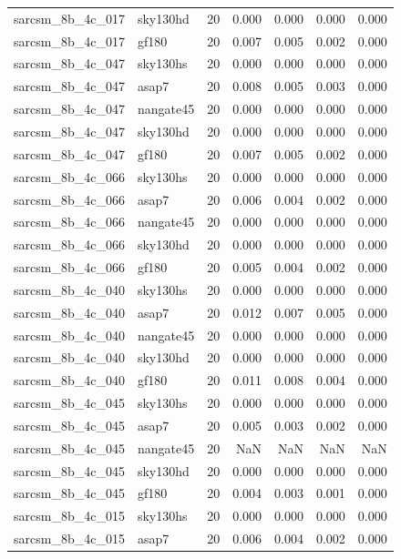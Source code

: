 \begin{tabular}{llrrrrr}
sarcsm\_8b\_4c\_017 & sky130hd & 20 & 0.000 & 0.000 & 0.000 & 0.000 \\
sarcsm\_8b\_4c\_017 & gf180 & 20 & 0.007 & 0.005 & 0.002 & 0.000 \\
sarcsm\_8b\_4c\_047 & sky130hs & 20 & 0.000 & 0.000 & 0.000 & 0.000 \\
sarcsm\_8b\_4c\_047 & asap7 & 20 & 0.008 & 0.005 & 0.003 & 0.000 \\
sarcsm\_8b\_4c\_047 & nangate45 & 20 & 0.000 & 0.000 & 0.000 & 0.000 \\
sarcsm\_8b\_4c\_047 & sky130hd & 20 & 0.000 & 0.000 & 0.000 & 0.000 \\
sarcsm\_8b\_4c\_047 & gf180 & 20 & 0.007 & 0.005 & 0.002 & 0.000 \\
sarcsm\_8b\_4c\_066 & sky130hs & 20 & 0.000 & 0.000 & 0.000 & 0.000 \\
sarcsm\_8b\_4c\_066 & asap7 & 20 & 0.006 & 0.004 & 0.002 & 0.000 \\
sarcsm\_8b\_4c\_066 & nangate45 & 20 & 0.000 & 0.000 & 0.000 & 0.000 \\
sarcsm\_8b\_4c\_066 & sky130hd & 20 & 0.000 & 0.000 & 0.000 & 0.000 \\
sarcsm\_8b\_4c\_066 & gf180 & 20 & 0.005 & 0.004 & 0.002 & 0.000 \\
sarcsm\_8b\_4c\_040 & sky130hs & 20 & 0.000 & 0.000 & 0.000 & 0.000 \\
sarcsm\_8b\_4c\_040 & asap7 & 20 & 0.012 & 0.007 & 0.005 & 0.000 \\
sarcsm\_8b\_4c\_040 & nangate45 & 20 & 0.000 & 0.000 & 0.000 & 0.000 \\
sarcsm\_8b\_4c\_040 & sky130hd & 20 & 0.000 & 0.000 & 0.000 & 0.000 \\
sarcsm\_8b\_4c\_040 & gf180 & 20 & 0.011 & 0.008 & 0.004 & 0.000 \\
sarcsm\_8b\_4c\_045 & sky130hs & 20 & 0.000 & 0.000 & 0.000 & 0.000 \\
sarcsm\_8b\_4c\_045 & asap7 & 20 & 0.005 & 0.003 & 0.002 & 0.000 \\
sarcsm\_8b\_4c\_045 & nangate45 & 20 & NaN & NaN & NaN & NaN \\
sarcsm\_8b\_4c\_045 & sky130hd & 20 & 0.000 & 0.000 & 0.000 & 0.000 \\
sarcsm\_8b\_4c\_045 & gf180 & 20 & 0.004 & 0.003 & 0.001 & 0.000 \\
sarcsm\_8b\_4c\_015 & sky130hs & 20 & 0.000 & 0.000 & 0.000 & 0.000 \\
sarcsm\_8b\_4c\_015 & asap7 & 20 & 0.006 & 0.004 & 0.002 & 0.000 \\

\end{tabular}

